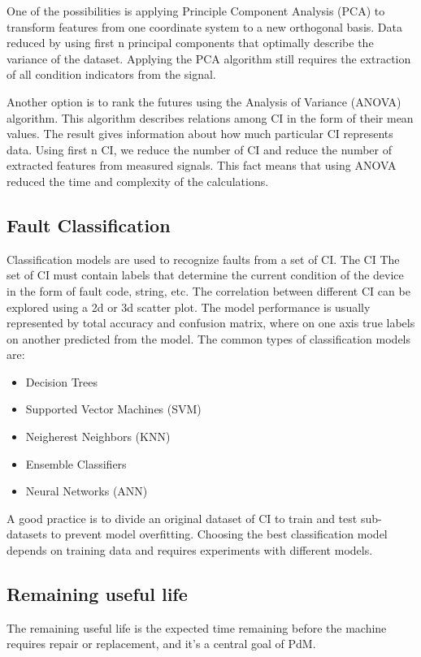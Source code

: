 One of the possibilities is applying Principle Component Analysis (PCA) to
transform features from one coordinate system to a new orthogonal basis.
Data reduced by using first n principal components that optimally describe
the variance of the dataset. Applying the PCA algorithm still requires the
extraction of all condition indicators from the signal.

Another option is to rank the futures using the Analysis of Variance
(ANOVA) algorithm. This algorithm describes relations among CI in the form
of their mean values. The result gives information about how much
particular CI represents data. Using first n CI, we reduce the number of CI
and reduce the number of extracted features from measured signals. This
fact means that using ANOVA reduced the time and complexity of the
calculations.

\subsection{Fault Classification}
Classification models are used to recognize faults from a set of CI. The CI
The set of CI must contain labels that determine the current condition of
the device in the form of fault code, string, etc. The correlation between
different CI can be explored using a 2d or 3d scatter plot. The model
performance is usually represented by total accuracy and confusion matrix,
where on one axis true labels on another predicted from the model.  The
common types of classification models are:

\begin{itemize}
    \item Decision Trees
    \item Supported Vector Machines (SVM)
    \item Neigherest Neighbors (KNN)
    \item Ensemble Classifiers
    \item Neural Networks (ANN)
\end{itemize}

A good practice is to divide an original dataset of CI to train and test
sub-datasets to prevent model overfitting. Choosing the best classification
model depends on training data and requires experiments with different
models.

\subsection{Remaining useful life}
The remaining useful life is the expected time remaining before the machine
requires repair or replacement, and it's a central goal of PdM.

